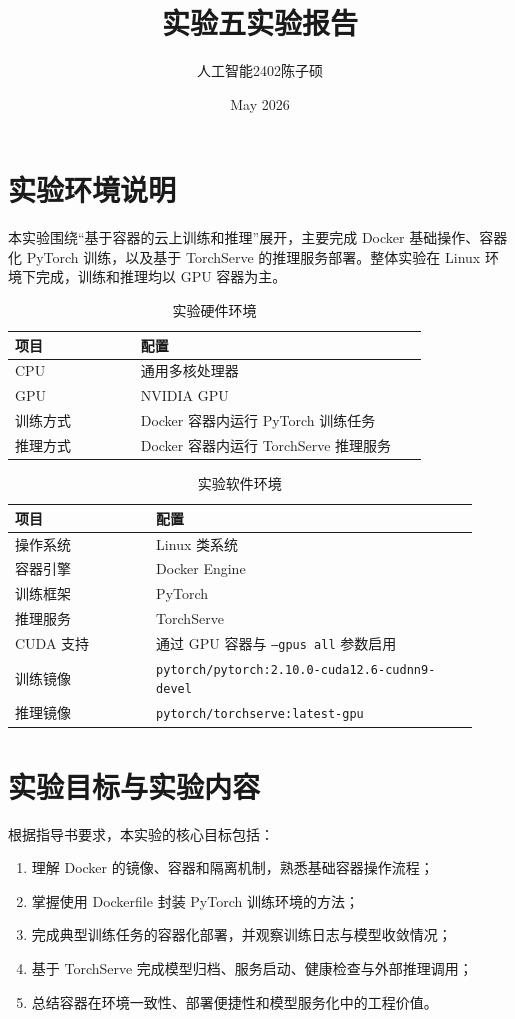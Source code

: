 \documentclass{article}
\title{实验五\hspace{2em}实验报告}
\author{人工智能2402\hspace{1em}陈子硕}
\date{May 2026}
\begin{document}
\maketitle

\section{实验环境说明}
本实验围绕“基于容器的云上训练和推理”展开，主要完成 Docker 基础操作、容器化 PyTorch 训练，以及基于 TorchServe 的推理服务部署。整体实验在 Linux 环境下完成，训练和推理均以 GPU 容器为主。

\begin{table}[H]
\centering
\caption{实验硬件环境}
\label{tab:hardware_env_exp5}
\begin{tabular}{p{0.28\linewidth} p{0.64\linewidth}}
\toprule
项目 & 配置 \\
\midrule
CPU & 通用多核处理器 \\
GPU & NVIDIA GPU \\
训练方式 & Docker 容器内运行 PyTorch 训练任务 \\
推理方式 & Docker 容器内运行 TorchServe 推理服务 \\
\bottomrule
\end{tabular}
\end{table}

\begin{table}[H]
\centering
\caption{实验软件环境}
\label{tab:software_env_exp5}
\begin{tabular}{p{0.28\linewidth} p{0.64\linewidth}}
\toprule
项目 & 配置 \\
\midrule
操作系统 & Linux 类系统 \\
容器引擎 & Docker Engine \\
训练框架 & PyTorch \\
推理服务 & TorchServe \\
CUDA 支持 & 通过 GPU 容器与 \texttt{--gpus all} 参数启用 \\
训练镜像 & \texttt{pytorch/pytorch:2.10.0-cuda12.6-cudnn9-devel} \\
推理镜像 & \texttt{pytorch/torchserve:latest-gpu} \\
\bottomrule
\end{tabular}
\end{table}

\section{实验目标与实验内容}
根据指导书要求，本实验的核心目标包括：
\begin{enumerate}
    \item 理解 Docker 的镜像、容器和隔离机制，熟悉基础容器操作流程；
    \item 掌握使用 Dockerfile 封装 PyTorch 训练环境的方法；
    \item 完成典型训练任务的容器化部署，并观察训练日志与模型收敛情况；
    \item 基于 TorchServe 完成模型归档、服务启动、健康检查与外部推理调用；
    \item 总结容器在环境一致性、部署便捷性和模型服务化中的工程价值。
\end{enumerate}
\end{document}
